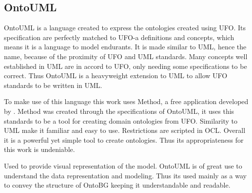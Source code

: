 \subsection{OntoUML}

OntoUML is a language created to express the ontologies created using UFO. Its specification are perfectly matched to UFO-a definitions and concepts, which means it is a language to model endurants. It is made similar to UML, hence the name, because of the proximity of UFO and UML standards. Many concepts well established in UML are in accord to UFO, only needing some specifications to be correct. Thus OntoUML is a heavyweight extension to UML to allow UFO standards to be written in UML. 

To make use of this language this work uses Method, a free application developed by \citeauthor{guizzardi_ontological_2005}. Method was created through the specifications of OntoUML, it uses this standards to be a tool for creating domain ontologies from UFO. Similarity to UML make it familiar and easy to use. Restrictions are scripted in OCL. Overall it is a powerful yet simple tool to create ontologies. Thus its appropriateness for this work is undeniable.

Used to provide visual representation of the model. OntoUML is of great use to understand the data representation and modeling. Thus its used mainly as a way to convey the structure of OntoBG keeping it understandable and readable.